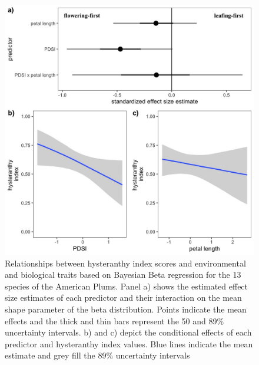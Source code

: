 \documentclass{article}[12pt]
\begin{document}
\begin{figure}[h!]
    \centering
 \includegraphics[width=\textwidth]{..//..//Plots/whatReviwerswant/hypoth_preds.jpeg}
    \caption{Relationships between hysteranthy index scores and environmental and biological traits based on Bayesian Beta regression for the 13 species of the American Plums. Panel a) shows the estimated effect size estimates of each predictor and their interaction on the mean shape parameter of the beta distribution. Points indicate the mean effects and the thick and thin bars represent the 50 and 89\% uncertainty intervals. b) and c) depict the conditional effects of each predictor and hysteranthy index values. Blue lines indicate the mean estimate and grey fill the 89\% uncertainty intervals}
    \label{fig:prunes}
\end{figure}
\end{document}
